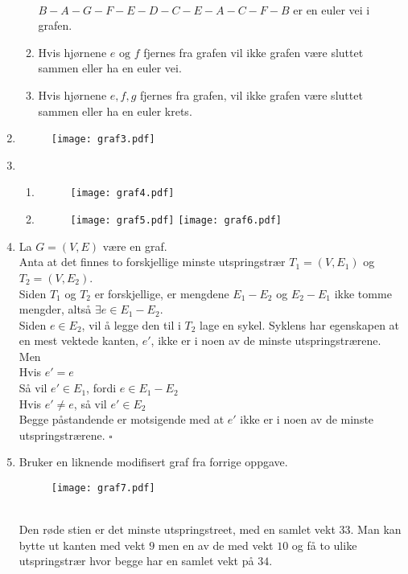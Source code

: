 \documentclass[a4paper, 12pt]{article}  %
\begin{document}
\begin{enumerate}
\begin{enumerate}
        \\ \(B-A-G-F-E-D-C-E-A-C-F-B\) er en euler vei i grafen.
        \item Hvis hjørnene \(e \text{ og } f\) fjernes fra grafen vil ikke grafen være sluttet sammen eller ha en euler vei.
        \item Hvis hjørnene \(e, f, g\) fjernes fra grafen, vil ikke grafen være sluttet sammen eller ha en euler krets.
    \end{enumerate}
    \item [\boxed{3}] \text{}
    \begin{figure}[h!]
        \centering
        \texttt{[image: graf3.pdf]}
    \end{figure}
    \newpage
    \item [\boxed{4}]
    \begin{enumerate}
        \item \text{}
        \begin{figure}[h!]
            \centering
            \texttt{[image: graf4.pdf]}
        \end{figure}
        \item \text{}
        \begin{figure}[h!]
            \centering
            \texttt{[image: graf5.pdf]}
            \texttt{[image: graf6.pdf]}
        \end{figure}
    \end{enumerate}
    \item [\boxed{5}] La \(G = (V, E)\) være en graf.
    \\ Anta at det finnes to forskjellige minste utspringstrær \(T_1 = (V, E_1)\) og \(T_2 = (V, E_2)\).
    \\ Siden \(T_1\) og \(T_2\) er forskjellige, er mengdene \(E_1 - E_2\) og \(E_2 - E_1\) ikke tomme mengder, altså \(\exists e \in E_1 - E_2\).
    \\ Siden \(e \in E_2\), vil å legge den til i \(T_2\) lage en sykel. Syklens har egenskapen at en mest vektede kanten, \(e'\), 
    ikke er i noen av de minste utspringstrærene. Men
    \\ Hvis \(e' = e\)
    \\ Så vil \(e' \in E_1\), fordi \(e \in E_1 - E_2\)
    \\ Hvis \(e' \neq e\), så vil \(e' \in E_2\)
    \\ Begge påstandende er motsigende med at \(e'\) ikke er i noen av de minste utspringstrærene. \(\square\)
    \item [\boxed{6}] Bruker en liknende modifisert graf fra forrige oppgave.
    \begin{figure}[h!]
        \centering
        \texttt{[image: graf7.pdf]}
    \end{figure}
    \\Den røde stien er det minste utspringstreet, med en samlet vekt \(33\). Man kan bytte ut kanten med vekt \(9\) men en av de med vekt \(10\) og få to ulike utspringstrær hvor begge har en samlet vekt på \(34\).
\end{enumerate}

\end{document}
